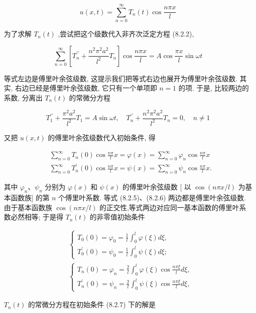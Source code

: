 \begin{solution}
$$
u(x, t)=\sum_{n=0}^{\infty} T_{n}(t) \cos \frac{n \pi x}{l}
$$

为了求解 $T_{n}(t)$ ,尝试把这个级数代入非齐次泛定方程 (8.2.2),

$$
\sum_{n=0}^{\infty}\left[T_{n}^{\prime \prime}+\frac{n^{2} \pi^{2} a^{2}}{l^{2}} T_{n}\right] \cos \frac{n \pi x}{l}=A \cos \frac{\pi x}{l} \sin \omega t
$$

等式左边是傅里叶余弦级数, 这提示我们把等式右边也展开为傅里叶余弦级数. 其实, 右边已经是傅里叶余弦级数, 它只有一个单项即 $n=1$ 的项. 于是, 比较两边的系数, 分离出 $T_{n}(t)$ 的常微分方程

$$
T_{1}^{\prime \prime}+\frac{\pi^{2} a^{2}}{l^{2}} T_{1}=A \sin \omega t, \quad T_{n}^{\prime \prime}+\frac{n^{2} \pi^{2} a^{2}}{l^{2}} T_{n}=0, \quad n \neq 1
$$

又把 $u(x, t)$ 的傅里叶余弦级数代入初始条件, 得

$$
\begin{aligned}
& \sum_{n=0}^{\infty} T_{n}(0) \cos \frac{n \pi}{l} x=\varphi(x)=\sum_{n=0}^{\infty} \varphi_{n} \cos \frac{n \pi}{l} x \\
& \sum_{n=0}^{\infty} T_{n}^{\prime}(0) \cos \frac{n \pi}{l} x=\psi(x)=\sum_{n=0}^{\infty} \psi_{n} \cos \frac{n \pi}{l} x .
\end{aligned}
$$

其中 $\varphi_{n} 、 \psi_{n}$ 分别为 $\varphi(x)$ 和 $\psi(x)$ 的傅里叶余弦级数 [ 以 $\cos (n \pi x / l)$ 为基本函数族] 的第 $n$ 个傅里叶系数. 等式 (8.2.5)、(8.2.6) 两边都是傅里叶余弦级数. 由于基本函数族 $\cos (n \pi x / l)$ 的正交性,等式两边对应同一基本函数的傅里叶系数必然相等; 于是得 $T_{n}(t)$ 的非零值初始条件

$$
\begin{aligned}
& \left\{\begin{array}{l}
T_{0}(0)=\varphi_{0}=\frac{1}{l} \int_{0}^{l} \varphi(\xi) d \xi, \\
T_{0}^{\prime}(0)=\psi_{0}=\frac{1}{l} \int_{0}^{l} \psi(\xi) d \xi ;
\end{array}\right. \\
& \left\{\begin{array}{l}
T_{n}(0)=\varphi_{n}=\frac{2}{l} \int_{0}^{l} \varphi(\xi) \cos \frac{n \pi \xi}{l} d \xi, \\
T_{n}^{\prime}(0)=\psi_{n}=\frac{2}{l} \int_{0}^{l} \psi(\xi) \cos \frac{n \pi \xi}{l} d \xi,
\end{array}\right.
\end{aligned}
$$

$T_{n}(t)$ 的常微分方程在初始条件 (8.2.7) 下的解是


\end{solution}
